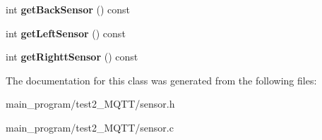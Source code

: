 \begin{DoxyCompactItemize}
\item 
int {\bfseries get\+Back\+Sensor} () const \hypertarget{class_sensor_a2a6d9722dec48cbd3b1c7868e29f3da6}{}\label{class_sensor_a2a6d9722dec48cbd3b1c7868e29f3da6}

\item 
int {\bfseries get\+Left\+Sensor} () const \hypertarget{class_sensor_a1a10f4b48c98e23a0e65dd161a0f6fd1}{}\label{class_sensor_a1a10f4b48c98e23a0e65dd161a0f6fd1}

\item 
int {\bfseries get\+Rightt\+Sensor} () const \hypertarget{class_sensor_a7e8723c2635a7eff0e130b4ca27451a7}{}\label{class_sensor_a7e8723c2635a7eff0e130b4ca27451a7}

\end{DoxyCompactItemize}


The documentation for this class was generated from the following files\+:\begin{DoxyCompactItemize}
\item 
main\+\_\+program/test2\+\_\+\+M\+Q\+T\+T/sensor.\+h\item 
main\+\_\+program/test2\+\_\+\+M\+Q\+T\+T/sensor.\+c\end{DoxyCompactItemize}
